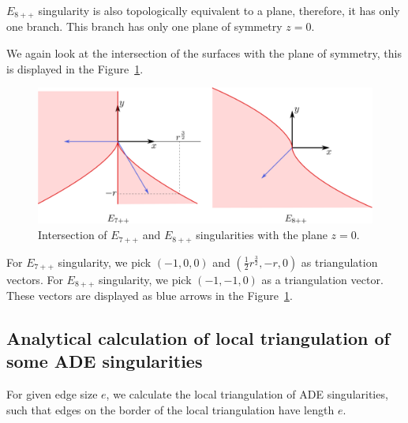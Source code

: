 $E_{8++}$ singularity is also topologically equivalent to a plane, therefore,
it has only one branch. This branch has only one plane of symmetry $z=0$.

We again look at the intersection of the surfaces with the plane of 
symmetry, this is displayed in the Figure~\ref{img:10}.

\begin{figure}
    \centerline{\includegraphics[scale=0.5]{images/img10}}
    \caption[Intersection of $E_{7++}$ and $E_{8++}$ singularities with 
    the plane $z=0$]
    {Intersection of $E_{7++}$ and $E_{8++}$ singularities with 
    the plane $z=0$.}
    \label{img:10}
\end{figure}

For $E_{7++}$ singularity, we pick $(-1, 0, 0)$ and 
$(\frac{1}{2}r^{\frac{3}{2}}, -r, 0)$ as triangulation vectors.
For $E_{8++}$ singularity, we pick $(-1, -1, 0)$ as a triangulation vector.
These vectors are displayed as blue arrows in the Figure~\ref{img:10}.

\subsection{Analytical calculation of local triangulation of some ADE singularities}
For given edge size $e$, we calculate the local triangulation of ADE
singularities, such that edges on the border of the local triangulation
have length $e$.
